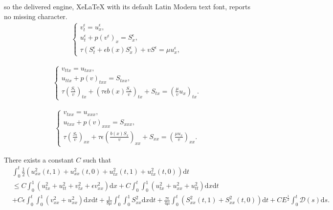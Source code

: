 \documentclass[10pt,a4paper]{amsart}
\newcommand{\dif}{\mathrm{d}}
\begin{document}
so the delivered engine, XeLaTeX with its default Latin Modern text font, reports no missing character.
\begin{align}\label{2.1}
\begin{cases}
v_t^\epsilon=u_x^\epsilon,\\
u_t^\epsilon+p(v^\epsilon)_x=S_x^\epsilon,\\
\tau (S_t^\epsilon+\epsilon b(x) S_x^\epsilon)+vS^\epsilon=\mu u_x^\epsilon, 
\end{cases}
\end{align}

\begin{align}\label{3.19}
\begin{cases}
v_{ttx}=u_{txx},\\
u_{ttx}+p(v)_{txx}=S_{txx},\\
\tau \left(\frac{S_t}{v}\right)_{tx}+\left(\tau \epsilon b(x)\frac{S_x}{v} \right)_{tx}+S_{tx}=\left(\frac{\mu}{v} u_x\right)_{tx}.
\end{cases}
\end{align}

\begin{align}\label{3.23}
\begin{cases}
v_{txx}=u_{xxx},\\
u_{txx}+p(v)_{xxx}=S_{xxx},\\
\tau \left(\frac{S_t}{v}\right)_{xx}+\tau \epsilon \left(\frac{b(x)S_x}{v}\right)_{xx}+S_{xx}=\left(\frac{\mu u_x}{v}\right)_{xx}.
\end{cases}
\end{align}

\begin{lemma}\label{Le3.10}
There exists a constant $C$ such that
\begin{align}
&\int_0^t \frac{1}{2} (u_{xx}^2(t,1)+u_{xx}^2(t,0)+ u_{tx}^2(t, 1)+u_{tx}^2(t, 0) ) \dif t \nonumber\\
 &\le C\int_0^1 (u_{tx}^2+u_{tt}^2+v_{tx}^2+\epsilon  v_{xx}^2 )\dif x
+C  \int_0^t\int_0^1 (u_{tx}^2+u_{xx}^2+u_{tt}^2 )\dif x \dif t \nonumber\\
&+C \epsilon \int_0^t\int_0^1 (v_{xx}^2+u_{xx}^2)\dif x \dif t +\frac{1}{8\mu} \int_0^t\int_0^1 S_{xx}^2 \dif x \dif t
+\frac{\tau \epsilon}{4\mu} \int_0^t (S_{xx}^2(t,1)+S_{xx}^2(t, 0)) \dif t +CE^\frac{1}{2}\int_0^t \mathcal D(s)\dif s .
\end{align}

\end{lemma}
\end{document}
